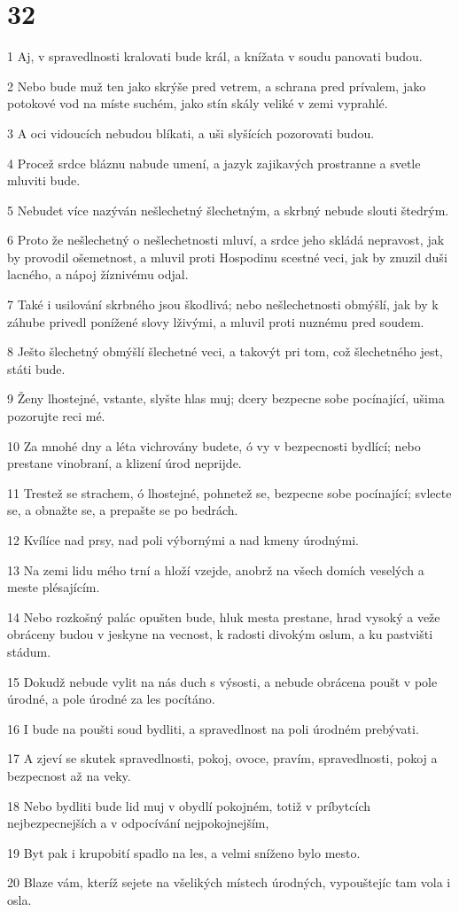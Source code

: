 \chapter{32}

\par 1 Aj, v spravedlnosti kralovati bude král, a knížata v soudu panovati budou.
\par 2 Nebo bude muž ten jako skrýše pred vetrem, a schrana pred prívalem, jako potokové vod na míste suchém, jako stín skály veliké v zemi vyprahlé.
\par 3 A oci vidoucích nebudou blíkati, a uši slyšících pozorovati budou.
\par 4 Procež srdce bláznu nabude umení, a jazyk zajikavých prostranne a svetle mluviti bude.
\par 5 Nebudet více nazýván nešlechetný šlechetným, a skrbný nebude slouti štedrým.
\par 6 Proto že nešlechetný o nešlechetnosti mluví, a srdce jeho skládá nepravost, jak by provodil ošemetnost, a mluvil proti Hospodinu scestné veci, jak by znuzil duši lacného, a nápoj žíznivému odjal.
\par 7 Také i usilování skrbného jsou škodlivá; nebo nešlechetnosti obmýšlí, jak by k záhube privedl ponížené slovy lživými, a mluvil proti nuznému pred soudem.
\par 8 Ješto šlechetný obmýšlí šlechetné veci, a takovýt pri tom, což šlechetného jest, státi bude.
\par 9 Ženy lhostejné, vstante, slyšte hlas muj; dcery bezpecne sobe pocínající, ušima pozorujte reci mé.
\par 10 Za mnohé dny a léta vichrovány budete, ó vy v bezpecnosti bydlící; nebo prestane vinobraní, a klizení úrod neprijde.
\par 11 Trestež se strachem, ó lhostejné, pohnetež se, bezpecne sobe pocínající; svlecte se, a obnažte se, a prepašte se po bedrách.
\par 12 Kvílíce nad prsy, nad poli výbornými a nad kmeny úrodnými.
\par 13 Na zemi lidu mého trní a hloží vzejde, anobrž na všech domích veselých a meste plésajícím.
\par 14 Nebo rozkošný palác opušten bude, hluk mesta prestane, hrad vysoký a veže obráceny budou v jeskyne na vecnost, k radosti divokým oslum, a ku pastvišti stádum.
\par 15 Dokudž nebude vylit na nás duch s výsosti, a nebude obrácena poušt v pole úrodné, a pole úrodné za les pocítáno.
\par 16 I bude na poušti soud bydliti, a spravedlnost na poli úrodném prebývati.
\par 17 A zjeví se skutek spravedlnosti, pokoj, ovoce, pravím, spravedlnosti, pokoj a bezpecnost až na veky.
\par 18 Nebo bydliti bude lid muj v obydlí pokojném, totiž v príbytcích nejbezpecnejších a v odpocívání nejpokojnejším,
\par 19 Byt pak i krupobití spadlo na les, a velmi sníženo bylo mesto.
\par 20 Blaze vám, kteríž sejete na všelikých místech úrodných, vypouštejíc tam vola i osla.


